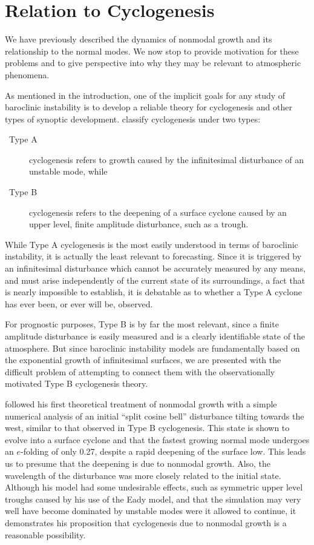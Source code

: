 \documentclass[letterpaper,11pt,onecolumn,twoside,titlepage]{article}
\begin{document}

\section{Relation to Cyclogenesis}

We have previously described the dynamics of nonmodal growth and its relationship to the normal modes. We now stop to provide motivation for these problems and to give perspective into why they may be relevant to atmospheric phenomena.

As mentioned in the introduction, one of the implicit goals for any study of baroclinic instability is to develop a reliable theory for cyclogenesis and other types of synoptic development. \citet{Petterssen+:1971} classify cyclogenesis under two types:
\begin{description}
\item[\ Type A] cyclogenesis refers to growth caused by the infinitesimal disturbance of an unstable mode, while
\item[\ Type B] cyclogenesis refers to the deepening of a surface cyclone caused by an upper level, finite amplitude disturbance, such as a trough.
\end{description}
While Type A cyclogenesis is the most easily understood in terms of baroclinic instability, it is actually the least relevant to forecasting. Since it is triggered by an infinitesimal disturbance which cannot be accurately measured by any means, and must arise independently of the current state of its surroundings, a fact that is nearly impossible to establish, it is debatable as to whether a Type A cyclone has ever been, or ever will be, observed.

For prognostic purposes, Type B is by far the most relevant, since a finite amplitude disturbance is easily measured and is a clearly identifiable state of the atmosphere. But since baroclinic instability models are fundamentally based on the exponential growth of infinitesimal surfaces, we are presented with the difficult problem of attempting to connect them with the observationally motivated Type B cyclogenesis theory.

\citet{Farrell:1985} followed his first theoretical treatment of nonmodal growth with a simple numerical analysis of an initial ``split cosine bell'' disturbance tilting towards the west, similar to that observed in Type B cyclogenesis. This state is shown to evolve into a surface cyclone and that the fastest growing normal mode undergoes an $e$-folding of only 0.27, despite a rapid deepening of the surface low. This leads us to presume that the deepening is due to nonmodal growth. Also, the wavelength of the disturbance was more closely related to the initial state. Although his model had some undesirable effects, such as symmetric upper level troughs caused by his use of the Eady model, and that the simulation may very well have become dominated by unstable modes were it allowed to continue, it demonstrates his proposition that cyclogenesis due to nonmodal growth is a reasonable possibility.
\end{document}
